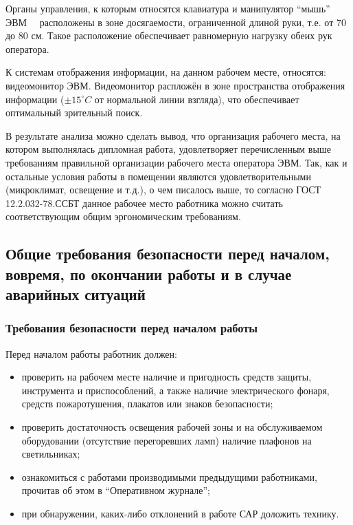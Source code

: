 Органы управления, к которым относятся клавиатура и манипулятор ``мышь'' ЭВМ \ \ расположены в зоне досягаемости, ограниченной длиной руки, т.е. от 70 до 80 см. Такое расположение обеспечивает равномерную нагрузку обеих рук оператора.

К системам отображения информации, на данном рабочем месте, относятся: видеомонитор ЭВМ. Видеомонитор распложён в зоне пространства отображения информации ($\pm15^{\circ}C$ от нормальной линии взгляда), что обеспечивает оптимальный зрительный поиск.

В результате анализа можно сделать вывод, что организация рабочего места, на котором выполнялась дипломная работа, удовлетворяет перечисленным выше требованиям правильной организации рабочего места оператора ЭВМ. Так, как и остальные условия работы в помещении являются удовлетворительными (микроклимат, освещение и т.д.), о чем писалось выше, то согласно ГОСТ 12.2.032-78.ССБТ данное рабочее место работника можно считать соответствующим общим эргономическим требованиям.

\subsection{Общие требования безопасности перед началом, вовремя, по окончании работы и в случае аварийных ситуаций}
\subsubsection{Требования безопасности перед началом работы}

Перед началом работы работник должен:

\begin{itemize}
\item проверить на рабочем месте наличие и пригодность средств защиты, инструмента и приспособлений, а также наличие электрического фонаря, средств пожаротушения, плакатов или знаков безопасности;
\item проверить достаточность освещения рабочей зоны и на обслуживаемом оборудовании (отсутствие перегоревших ламп) наличие плафонов на светильниках;
\item ознакомиться с работами производимыми предыдущими работниками, прочитав об этом в ``Оперативном журнале'';
\item при обнаружении, каких-либо отклонений в работе САР доложить технику.
\end{itemize}
